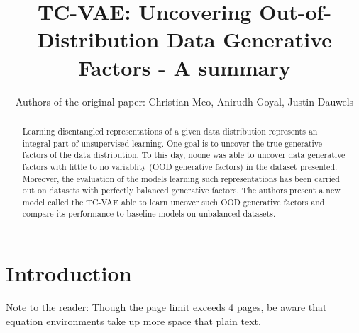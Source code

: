 \documentclass[twoside,11pt]{article}
\begin{document}
\title{TC-VAE: Uncovering Out-of-Distribution Data Generative Factors - A summary}

\author{Authors of the original paper: Christian Meo, Anirudh Goyal, Justin Dauwels}
\maketitle


\begin{abstract}%
  Learning disentangled representations of a given data distribution represents an integral part of unsupervised learning.
  One goal is to uncover the true generative factors of the data distribution.
  To this day, noone was able to uncover data generative factors with little to no variablity (OOD generative factors) in the dataset presented.
  Moreover, the evaluation of the models learning such representations has been carried out on datasets with perfectly balanced generative factors.
  The authors present a new model called the TC-VAE able to learn uncover such OOD generative factors and compare its performance to baseline models on unbalanced datasets.



\end{abstract}

\section{Introduction}
Note to the reader: Though the page limit exceeds 4 pages, be aware that equation environments take up more space that plain text.
\end{document}
